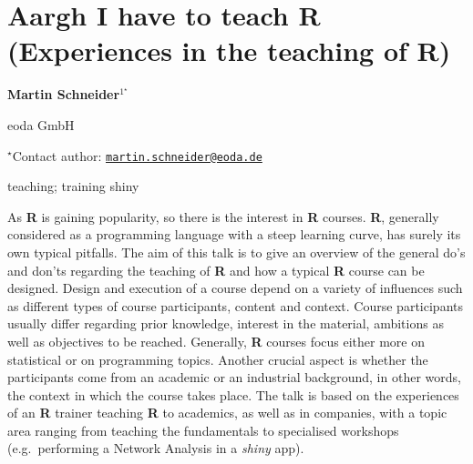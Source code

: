 \documentclass[\main/boa.tex]{subfiles}
\begin{document}
\pagestyle{empty}

\section{Aargh I have to teach R (Experiences in the teaching of R)}

\begin{center}
  {\bf Martin Schneider$^{1^\star}$}
\end{center}

\vskip 0.3cm

\begin{affiliations}
\begin{enumerate}
\begin{minipage}{0.915\textwidth}
\centering
\item eoda GmbH \\[-2pt]
\end{minipage}
\end{enumerate}
$^\star$Contact author: \href{mailto:martin.schneider@eoda.de}{\nolinkurl{martin.schneider@eoda.de}}\\
\end{affiliations}

\vskip 0.5cm

\begin{minipage}{0.915\textwidth}
\keywords teaching; training
\packages shiny
\end{minipage}

\vskip 0.8cm

As \textbf{R} is gaining popularity, so there is the interest in
\textbf{R} courses. \textbf{R}, generally considered as a programming
language with a steep learning curve, has surely its own typical
pitfalls. The aim of this talk is to give an overview of the general
do's and don'ts regarding the teaching of \textbf{R} and how a typical
\textbf{R} course can be designed. Design and execution of a course
depend on a variety of influences such as different types of course
participants, content and context. Course participants usually differ
regarding prior knowledge, interest in the material, ambitions as well
as objectives to be reached. Generally, \textbf{R} courses focus either
more on statistical or on programming topics. Another crucial aspect is
whether the participants come from an academic or an industrial
background, in other words, the context in which the course takes place.
The talk is based on the experiences of an \textbf{R} trainer teaching
\textbf{R} to academics, as well as in companies, with a topic area
ranging from teaching the fundamentals to specialised workshops
(e.g.~performing a Network Analysis in a \emph{shiny} app).
\end{document}
